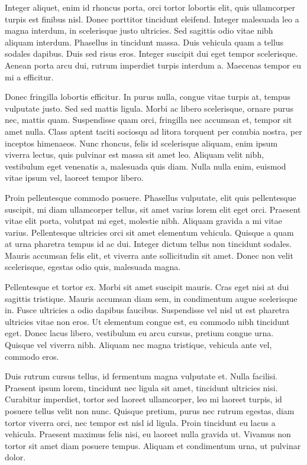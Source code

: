 Integer aliquet, enim id rhoncus porta, orci tortor lobortis elit, quis ullamcorper turpis est finibus nisl. Donec porttitor tincidunt eleifend. Integer malesuada leo a magna interdum, in scelerisque justo ultricies. Sed sagittis odio vitae nibh aliquam interdum. Phasellus in tincidunt massa. Duis vehicula quam a tellus sodales dapibus. Duis sed risus eros. Integer suscipit dui eget tempor scelerisque. Aenean porta arcu dui, rutrum imperdiet turpis interdum a. Maecenas tempor eu mi a efficitur.

Donec fringilla lobortis efficitur. In purus nulla, congue vitae turpis at, tempus vulputate justo. Sed sed mattis ligula. Morbi ac libero scelerisque, ornare purus nec, mattis quam. Suspendisse quam orci, fringilla nec accumsan et, tempor sit amet nulla. Class aptent taciti sociosqu ad litora torquent per conubia nostra, per inceptos himenaeos. Nunc rhoncus, felis id scelerisque aliquam, enim ipsum viverra lectus, quis pulvinar est massa sit amet leo. Aliquam velit nibh, vestibulum eget venenatis a, malesuada quis diam. Nulla nulla enim, euismod vitae ipsum vel, laoreet tempor libero.

Proin pellentesque commodo posuere. Phasellus vulputate, elit quis pellentesque suscipit, mi diam ullamcorper tellus, sit amet varius lorem elit eget orci. Praesent vitae elit porta, volutpat mi eget, molestie nibh. Aliquam gravida a mi vitae varius. Pellentesque ultricies orci sit amet elementum vehicula. Quisque a quam at urna pharetra tempus id ac dui. Integer dictum tellus non tincidunt sodales. Mauris accumsan felis elit, et viverra ante sollicitudin sit amet. Donec non velit scelerisque, egestas odio quis, malesuada magna.

Pellentesque et tortor ex. Morbi sit amet suscipit mauris. Cras eget nisi at dui sagittis tristique. Mauris accumsan diam sem, in condimentum augue scelerisque in. Fusce ultricies a odio dapibus faucibus. Suspendisse vel nisl ut est pharetra ultricies vitae non eros. Ut elementum congue est, eu commodo nibh tincidunt eget. Donec lacus libero, vestibulum eu arcu cursus, pretium congue urna. Quisque vel viverra nibh. Aliquam nec magna tristique, vehicula ante vel, commodo eros.

Duis rutrum cursus tellus, id fermentum magna vulputate et. Nulla facilisi. Praesent ipsum lorem, tincidunt nec ligula sit amet, tincidunt ultricies nisi. Curabitur imperdiet, tortor sed laoreet ullamcorper, leo mi laoreet turpis, id posuere tellus velit non nunc. Quisque pretium, purus nec rutrum egestas, diam tortor viverra orci, nec tempor est nisl id ligula. Proin tincidunt eu lacus a vehicula. Praesent maximus felis nisi, eu laoreet nulla gravida ut. Vivamus non tortor sit amet diam posuere tempus. Aliquam et condimentum urna, ut pulvinar dolor.

